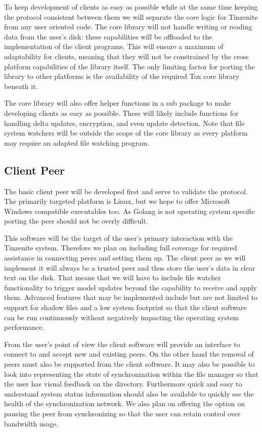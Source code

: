 To keep development of clients as easy as possible while at the same time keeping the protocol consistent between them we will separate the core logic for Tinzenite from any user oriented code.
The core library will not handle writing or reading data from the user's disk: these capabilities will be offloaded to the implementation of the client programs.
This will ensure a maximum of adaptability for clients, meaning that they will not be constrained by the cross platform capabilities of the library itself.
The only limiting factor for porting the library to other platforms is the availability of the required Tox core library beneath it.

The core library will also offer helper functions in a sub package to make developing clients as easy as possible.
These will likely include functions for handling delta updates, encryption, and even update detection.
Note that file system watchers will be outside the scope of the core library as every platform may require an adapted file watching program.

\subsection{Client Peer}

The basic client peer will be developed first and serve to validate the protocol.
The primarily targeted platform is Linux, but we hope to offer Microsoft Windows compatible executables too.
As Golang is not operating system specific porting the peer should not be overly difficult.

This software will be the target of the user's primary interaction with the Tinzenite system.
Therefore we plan on including full coverage for required assistance in connecting peers and setting them up.
The client peer as we will implement it will always be a trusted peer and thus store the user's data in clear text on the disk.
That means that we will have to include file watcher functionality to trigger model updates beyond the capability to receive and apply them.
Advanced features that may be implemented include but are not limited to support for shadow files and a low system footprint so that the client software can be run continuously without negatively impacting the operating system performance.

From the user's point of view the client software will provide an interface to connect to and accept new and existing peers.
On the other hand the removal of peers must also be supported from the client software.
It may also be possible to look into representing the state of synchronization within the file manager so that the user has visual feedback on the directory.
Furthermore quick and easy to understand system status information should also be available to quickly see the health of the synchronization network.
We also plan on offering the option on pausing the peer from synchronizing so that the user can retain control over bandwidth usage.

